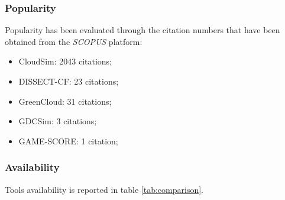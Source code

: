 {\subsubsection{Popularity}
Popularity has been evaluated through the citation numbers that have been obtained from the \emph{SCOPUS} platform:
\begin{itemize}
    \item CloudSim: 2043 citations;
    \item DISSECT-CF: 23 citations;
    \item GreenCloud: 31 citations; 
    \item GDCSim: 3 citations;
    \item GAME-SCORE: 1 citation;
\end{itemize}

\subsubsection{Availability}
Tools availability is reported in table \ref{tab:comparison}.

}
